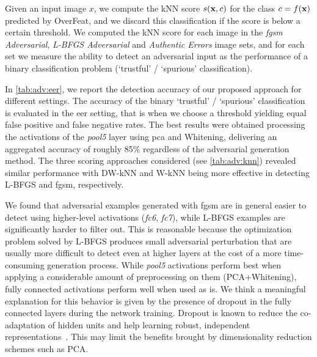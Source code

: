 Given an input image $x$, we compute the kNN score $s(\mathbf{x}, c)$ for the class $c = f(\mathbf{x})$ predicted by OverFeat, and we discard this classification if the score is below a certain threshold.
We computed the kNN score for each image in the \emph{\gls{fgsm} Adversarial}, \emph{L-BFGS Adversarial} and \emph{Authentic Errors} image sets, and for each set we measure the ability to detect an adversarial input as the performance of a binary classification problem (`trustful' / `spurious' classification).


In \ref{tab:adv:eer}, we report the detection accuracy of our proposed approach for different settings. %
The accuracy of the binary `trustful' / `spurious' classification is evaluated in the \acrfull{eer} setting, that is when we choose a threshold yielding equal false positive and false negative rates.
The best results were obtained processing the activations of the \emph{pool5} layer using \gls{pca} and Whitening, delivering an aggregated accuracy of roughly 85\% regardless of the adversarial generation method.
The three scoring approaches considered (see \ref{tab:adv:knn}) revealed similar performance with DW-kNN and W-kNN being more effective in detecting L-BFGS and \gls{fgsm}, respectively.

We found that adversarial examples generated with \gls{fgsm} are in general easier to detect using higher-level activations (\emph{fc6}, \emph{fc7}), while L-BFGS examples are significantly harder to filter out.
This is reasonable because the optimization problem solved by L-BFGS produces small adversarial perturbation that are usually more difficult to detect even at higher layers at the cost of a more time-consuming generation process.
While \emph{pool5} activations perform best when applying a considerable amount of preprocessing on them (PCA+Whitening), fully connected activations perform well when used as is.
We think a meaningful explanation for this behavior is given by the presence of dropout in the fully connected layers during the network training.
Dropout is known to reduce the co-adaptation of hidden units and help learning robust, independent representations~\cite{srivastava2014dropout}.
This may limit the benefits brought by dimensionality reduction schemes such as PCA.

